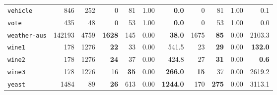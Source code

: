 \begin{tabular}{lccrrrrrrrr}
\texttt{vehicle} & \multicolumn{1}{r}{846} & \multicolumn{1}{r}{252}  & 0 & 81 & 1.00 & \textbf{0.0} & 0 & 81 & 1.00 & 0.1\\
\texttt{vote} & \multicolumn{1}{r}{435} & \multicolumn{1}{r}{48}  & 0 & 53 & 1.00 & \textbf{0.0} & 0 & 53 & 1.00 & 0.0\\
\texttt{weather-aus} & \multicolumn{1}{r}{142193} & \multicolumn{1}{r}{4759}  & \textbf{1628} & 145 & 0.00 & \textbf{38.0} & 1675 & \textbf{85} & 0.00 & 2103.3\\
\texttt{wine1} & \multicolumn{1}{r}{178} & \multicolumn{1}{r}{1276}  & \textbf{22} & 33 & 0.00 & 541.5 & 23 & \textbf{29} & 0.00 & \textbf{132.0}\\
\texttt{wine2} & \multicolumn{1}{r}{178} & \multicolumn{1}{r}{1276}  & \textbf{24} & 37 & 0.00 & 424.8 & 27 & \textbf{31} & 0.00 & \textbf{0.6}\\
\texttt{wine3} & \multicolumn{1}{r}{178} & \multicolumn{1}{r}{1276}  & 16 & \textbf{35} & 0.00 & \textbf{266.0} & \textbf{15} & 37 & 0.00 & 2619.2\\
\texttt{yeast} & \multicolumn{1}{r}{1484} & \multicolumn{1}{r}{89}  & \textbf{26} & 613 & 0.00 & \textbf{1244.0} & 170 & \textbf{275} & 0.00 & 3113.1\\
\bottomrule
\end{tabular}
